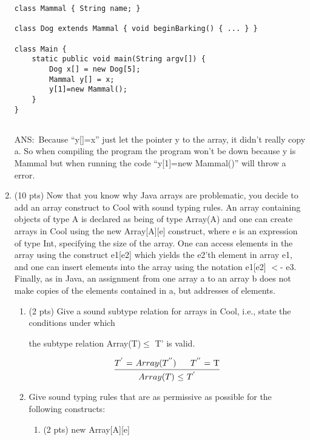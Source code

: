 \documentclass[10pt]{article}
\newcommand{\infertext}[2]{\infer{{\textrm{#1}}}{#2}}
\begin{document}
\begin{enumerate}
\begin{verbatim}
class Mammal { String name; }

class Dog extends Mammal { void beginBarking() { ... } }

class Main {
    static public void main(String argv[]) {
        Dog x[] = new Dog[5];
        Mammal y[] = x;
       	y[1]=new Mammal();
    }
}
          
\end{verbatim}

ANS:\
Because ``y[]=x''  just let the pointer y to the array, it didn't really copy a. So when compiling the program the program won't be down because y is Mammal but when running the code ``y[1]=new Mammal()'' will throw a error.
 

\medskip
\item (10 pts) Now that you know why Java arrays are problematic, you decide to add an array construct
to Cool with sound typing rules. An array containing objects of type A is declared as being of type
\textsf{Array(A)} and one can create arrays in Cool using the \textsf{new Array[A][e]} construct, where \textsf{e} is an
expression of type \textsf{Int}, specifying the size of the array.
One can access elements in the array using
the construct \textsf{e1[e2]} which yields the \textsf{e2}'th element in array \textsf{e1},
and one can insert elements into the array using the notation \textsf{e1[e2] $<$- e3}.
Finally, as in Java, an assignment from one array \textsf{a} to an
array \textsf{b} does not make copies of the elements contained in \textsf{a}, but addresses of elements.

\begin{enumerate}
  \item (2 pts) Give a sound subtype relation for arrays in Cool, i.e., state the conditions under which
  	


the subtype relation \textsf{Array(T)$\le$ T'} is valid.
\newline

\[\infertext
      {$Array(T)$ $\le$ $T^{'}$}
      {\textrm{$T^{'}$ = $Array(T^{''})$}
      \ \ \ \ \ \textrm{$T^{''}$ = T}
      }
    \]
\newline




  \item Give sound typing rules that are as permissive as possible for the following constructs:

\begin{enumerate}
    \item (2 pts) \textsf{new Array[A][e]}
\newline


\end{enumerate}
\end{enumerate}
\end{enumerate}
\end{document}
